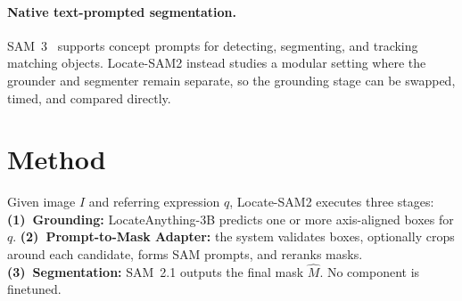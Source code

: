 \documentclass[11pt,a4paper]{article}
\begin{document}
\paragraph{Native text-prompted segmentation.}
SAM~3~\cite{sam3_2025} supports concept prompts for detecting, segmenting, and tracking matching objects.
Locate-SAM2 instead studies a modular setting where the grounder and segmenter remain separate, so the grounding stage can be swapped, timed, and compared directly.

\section{Method}
\label{sec:method}

Given image $I$ and referring expression $q$, Locate-SAM2 executes three stages:
\textbf{(1)~Grounding:} LocateAnything-3B predicts one or more axis-aligned boxes for $q$.
\textbf{(2)~Prompt-to-Mask Adapter:} the system validates boxes, optionally crops around each candidate, forms SAM prompts, and reranks masks.
\textbf{(3)~Segmentation:} SAM~2.1 outputs the final mask $\hat{M}$.
No component is finetuned.
\end{document}

